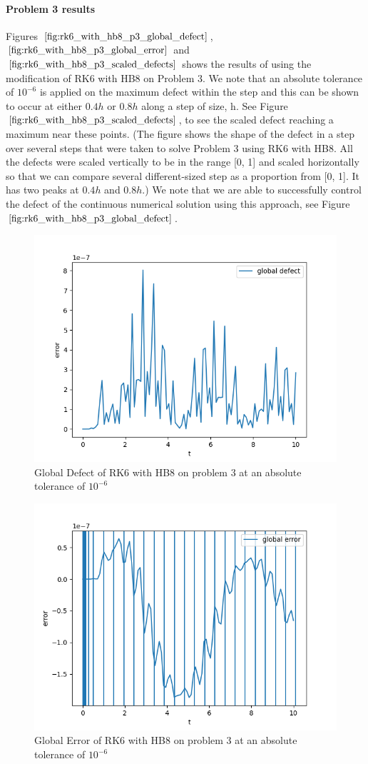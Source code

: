 \documentclass{article}
\begin{document}
\paragraph{Problem 3 results}
Figures $\ref{fig:rk6_with_hb8_p3_global_defect}$, $\ref{fig:rk6_with_hb8_p3_global_error}$ and $\ref{fig:rk6_with_hb8_p3_scaled_defects}$ shows the results of using the modification of RK6 with HB8 on Problem 3. 
We note that an absolute tolerance of $10^{-6}$ is applied on the maximum defect within the step and this can be shown to occur at either $0.4h$ or $0.8h$ along a step of size, h. See Figure $\ref{fig:rk6_with_hb8_p3_scaled_defects}$, to see the scaled defect reaching a maximum near these points. (The figure shows the shape of the defect in a step over several steps that were taken to solve Problem 3 using RK6 with HB8. All the defects were scaled vertically to be in the range [0, 1] and scaled horizontally so that we can compare several different-sized step as a proportion from [0, 1]. It has two peaks at $0.4h$ and $0.8h$.) We note that we are able to successfully control the defect of the continuous numerical solution using this approach, see Figure $\ref{fig:rk6_with_hb8_p3_global_defect}$. 
 

\begin{figure}[H]
\centering
\includegraphics[width=0.7\linewidth]{./figures/rk6_with_hb8_p3_global_defect}
\caption{Global Defect of RK6 with HB8 on problem 3 at an absolute tolerance of $10^{-6}$}
\label{fig:rk6_with_hb8_p3_global_defect}
\end{figure}

\begin{figure}[H]
\centering
\includegraphics[width=0.7\linewidth]{./figures/rk6_with_hb8_p3_global_error}
\caption{Global Error of RK6 with HB8 on problem 3 at an absolute tolerance of $10^{-6}$}
\label{fig:rk6_with_hb8_p3_global_error}
\end{figure}
\end{document}
